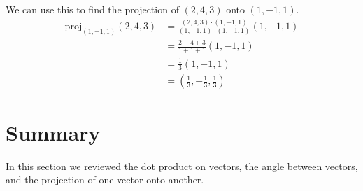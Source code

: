 \documentclass{ximera}
\begin{document}
\begin{example}
We can use this to find the projection of $(2,4,3)$ onto $(1,-1,1)$.
\begin{align*}
\textrm{proj}_{(1,-1,1)}(2,4,3) &= \frac{(2,4,3)\cdot(1,-1,1)}{(1,-1,1)\cdot(1,-1,1)}(1,-1,1)\\
&= \frac{2-4+3}{1+1+1}(1,-1,1)\\
&= \frac{1}{3}(1,-1,1)\\
&= \left( \frac{1}{3},-\frac{1}{3}, \frac{1}{3}\right)
\end{align*}
\end{example}

\section{Summary}

In this section we reviewed the dot product on vectors, the angle between vectors, and the projection of one vector onto another.
\end{document}
